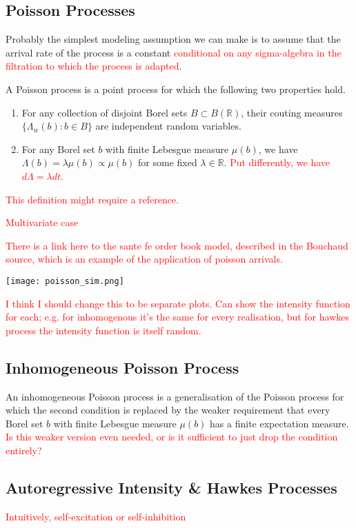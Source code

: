 \documentclass[honours,12pt]{unswthesis}
\numberwithin{equation}{section}
\begin{document}
\subsection{Poisson Processes}
Probably the simplest modeling assumption we can make is to assume that the arrival rate of the process is a constant \textcolor{red}{conditional on any sigma-algebra in the filtration to which the process is adapted}.

A Poisson process is a point process for which the following two properties hold.
\begin{enumerate}
	\item For any collection of disjoint Borel sets $B\subset B(\mathbb R)$, their couting measures $\{\Lambda_w(b) : b\in B\}$ are independent random variables.
	\item For any Borel set $b$ with finite Lebesgue measure $\mu(b)$, we have $\Lambda(b)=\lambda \mu(b)\propto \mu(b)$ for some fixed $\lambda\in\mathbb{R}$. \textcolor{red}{Put differently, we have $d\Lambda=\lambda dt$.}
\end{enumerate}

\textcolor{red}{This definition might require a reference.}

\textcolor{red}{Multivariate case}

\textcolor{red}{There is a link here to the sante fe order book model, described in the Bouchaud source, which is an example of the application of poisson arrivals.}

\texttt{[image: poisson\_sim.png]}

\textcolor{red}{I think I should change this to be separate plots. Can show the intensity function for each; e.g. for inhomogenous it's the same for every realisation, but for hawkes process the intensity function is itself random.}


\subsection{Inhomogeneous Poisson Process}
An inhomogeneous Poisson process is a generalisation of the Poisson process for which the second condition is replaced by the weaker requirement that every Borel set $b$ with finite Lebesgue measure $\mu(b)$ has a finite expectation measure. \textcolor{red}{Is this weaker version even needed, or is it sufficient to just drop the condition entirely?}

\subsection{Autoregressive Intensity \& Hawkes Processes}
\textcolor{red}{Intuitively, self-excitation or self-inhibition}
\end{document}
